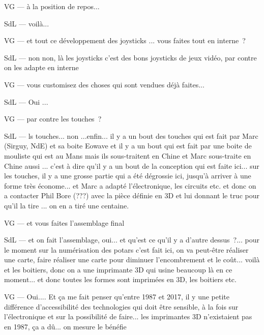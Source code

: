 VG — à la position de repos... 

SdL — voilà...  

VG — et tout ce développement des joysticks ... vous faites tout en interne ?  

SdL — non non, là les joysticks c'est des bons joysticks de jeux vidéo, par contre on les adapte en interne 

VG — vous customisez des choses qui sont vendues déjà faites...  

SdL — Oui ... 

VG — par contre les touches ? 

SdL — ls touches... non ...enfin... il y a un bout des touches qui est fait par Marc (Sirguy, NdE) et sa boite Eowave et il y a un bout qui est fait par une boite de mouliste qui est au Mans mais ils sous-traitent en Chine et Marc sous-traite en Chine aussi ... c'est à dire qu'il y a un bout de la conception qui est faite ici... sur les touches, il y a une grosse partie qui a été dégrossie ici, jusqu'à arriver à une forme très économe... et Marc a adapté l'électronique, les circuits etc. et donc on a contacter Phil Bore (???) avec la pièce définie en 3D et lui donnant le truc pour qu'il la tire ... on en a tiré une centaine. 

VG — et vous faites l'assemblage final 

SdL — et on fait l'assemblage, oui... et qu'est ce qu'il y a d'autre dessus ?... pour le moment sur la numérisation des potars c'est fait ici, on va peut-être réaliser une carte, faire réaliser une carte pour diminuer l'encombrement et le coût... voilà et les boitiers, donc on a une imprimante 3D qui usine beaucoup là en ce moment... et donc toutes les formes sont imprimées en 3D, les boitiers etc. 

VG — Oui.... Et ça me fait penser qu'entre 1987 et 2017, il y une petite différence d'accessibilité des technologies qui doit être sensible, à la fois sur l'électronique et sur la possibilité de faire... les imprimantes 3D n'existaient pas en 1987, ça a dû... on mesure le bénéfie 

